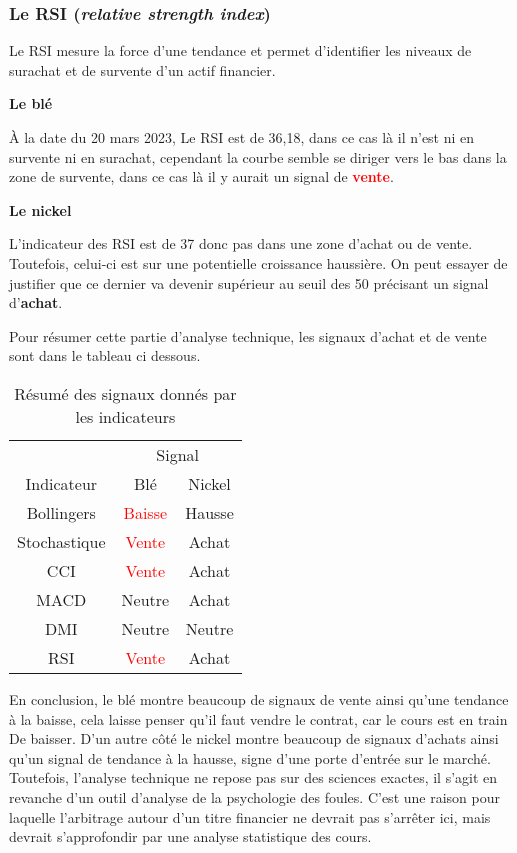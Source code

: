 \subsubsection*{Le RSI (\textit{relative strength index})}
Le RSI mesure la force d'une tendance et permet d'identifier les niveaux de surachat et de survente d'un actif financier.
\begin{multicols}{2}
\centerline{\textbf{Le blé}}
À la date du 20 mars 2023, Le RSI est de 36,18, dans ce cas là il n'est ni en survente ni en surachat, cependant la courbe semble se diriger vers le bas dans la zone de 
survente, dans ce cas là il y aurait un signal de \textcolor{red}{\textbf{vente}}.

\columnbreak
\centerline{\textbf{Le nickel}}
L'indicateur des RSI est de 37 donc pas dans une zone d'achat ou de vente. Toutefois, celui-ci est sur une potentielle croissance haussière. On peut essayer de justifier 
que ce dernier va devenir supérieur au seuil des 50 précisant un signal d'\textcolor{OliveGreen}{\textbf{achat}}. 
\end{multicols}

Pour résumer cette partie d'analyse technique, les signaux d'achat et de vente sont dans le tableau ci dessous.
\begin{table}[H]
    \centering
    \caption{Résumé des signaux donnés par les indicateurs}
    \sffamily
    \begin{tabular}{ccc}
    \toprule
                    & \multicolumn{2}{c}{Signal} \\
    Indicateur     & Blé                        & Nickel \\
    \cmidrule(r){1-1}\cmidrule(lr){2-3}
    Bollingers      & \textcolor{red}{Baisse}    & \textcolor{OliveGreen}{Hausse}\\
    Stochastique    & \textcolor{red}{Vente}     & \textcolor{OliveGreen}{Achat} \\
    CCI             & \textcolor{red}{Vente}     & \textcolor{OliveGreen}{Achat} \\
    MACD            & Neutre                     & \textcolor{OliveGreen}{Achat} \\
    DMI             & Neutre                     & Neutre                   \\
    RSI             & \textcolor{red}{Vente}     & \textcolor{OliveGreen}{Achat} \\
    \bottomrule
    \end{tabular}
\end{table}

En conclusion, le blé montre beaucoup de signaux de vente ainsi qu'une tendance à la baisse, cela laisse penser qu'il faut vendre le contrat, car le cours est en train De
baisser. D'un autre côté le nickel montre beaucoup de signaux d'achats ainsi qu'un signal de tendance à la hausse, signe d'une porte d'entrée sur le marché.\\[11pt]
Toutefois, l'analyse technique ne repose pas sur des sciences exactes, il s'agit en revanche d'un outil d'analyse de la psychologie des foules. C'est une raison pour 
laquelle l'arbitrage autour d'un titre financier ne devrait pas s'arrêter ici, mais devrait s'approfondir par une analyse statistique des cours.